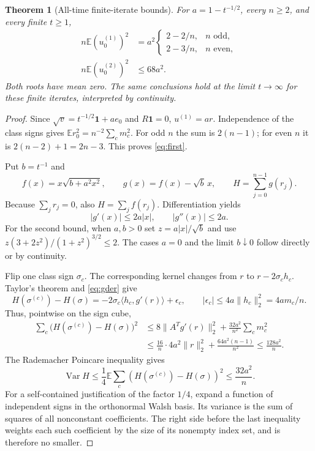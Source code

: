 \documentclass[11pt]{article}
\newtheorem{theorem}{Theorem}[section]
\theoremstyle{remark}\newtheorem{remark}[theorem]{Remark}
\newcommand{\E}{\mathbb E}
\newcommand{\one}{\mathbf 1}
\newcommand{\sgn}{\sigma}
\begin{document}
\begin{theorem}[All-time finite-iterate bounds]\label{thm:two}
For $a=1-t^{-1/2}$, every $n\ge2$, and every finite $t\ge1$,
\begin{align}
 n\E(u^{(1)}_0)^2
 &=a^2\begin{cases}2-2/n,&n\text{ odd},\\2-3/n,&n\text{ even},\end{cases}
 \label{eq:first}\!\\[-1ex]
 n\E(u^{(2)}_0)^2&\le68a^2.\label{eq:second}
\end{align}
Both roots have mean zero. The same conclusions hold at the limit $t\to\infty$
for these finite iterates, interpreted by continuity.
\end{theorem}
\begin{proof}
Since $\sqrt v=t^{-1/2}\one+ae_0$ and $R\one=0$,
$u^{(1)}=ar$. Independence of the class signs gives
$\E r_0^2=n^{-2}\sum_c m_c^2$. For odd $n$ the sum is $2(n-1)$; for even
$n$ it is $2(n-2)+1=2n-3$. This proves \eqref{eq:first}.

Put $b=t^{-1}$ and
\[
 f(x)=x\sqrt{b+a^2x^2},\qquad
 g(x)=f(x)-\sqrt b\,x,\qquad H=\sum_{j=0}^{n-1}g(r_j).
\]
Because $\sum_j r_j=0$, also $H=\sum_jf(r_j)$. Differentiation yields
\begin{equation}\label{eq:gder}
 |g'(x)|\le2a|x|,\qquad |g''(x)|\le2a.
\end{equation}
For the second bound, when $a,b>0$ set $z=a|x|/\sqrt b$ and use
$z(3+2z^2)/(1+z^2)^{3/2}\le2$. The cases $a=0$ and the limit $b\downarrow0$
follow directly or by continuity.

Flip one class sign $\sgn_c$. The corresponding kernel changes from $r$
to $r-2\sgn_ch_c$. Taylor's theorem and \eqref{eq:gder} give
\[
 H(\sgn^{(c)})-H(\sgn)
   =-2\sgn_c\langle h_c,g'(r)\rangle+\epsilon_c,
 \qquad |\epsilon_c|\le4a\|h_c\|_2^2=4am_c/n.
\]
Thus, pointwise on the sign cube,
\begin{align*}
 \sum_c\bigl(H(\sgn^{(c)})-H(\sgn)\bigr)^2
 &\le8\|A^Tg'(r)\|_2^2+\frac{32a^2}{n^2}\sum_cm_c^2\\
 &\le\frac{16}{n}\cdot4a^2\|r\|_2^2+\frac{64a^2(n-1)}{n^2}
 \le\frac{128a^2}{n}.
\end{align*}
The Rademacher Poincare inequality gives
\begin{equation}\label{eq:Hvar}
 \operatorname{Var}H\le\frac14\E\sum_c
     (H(\sgn^{(c)})-H(\sgn))^2\le\frac{32a^2}{n}.
\end{equation}
For a self-contained justification of the factor $1/4$, expand a function
of independent signs in the orthonormal Walsh basis. Its variance is the sum
of squares of all nonconstant coefficients. The right side before the last
inequality weights each such coefficient by the size of its nonempty index
set, and is therefore no smaller.


\end{proof}
\end{document}
